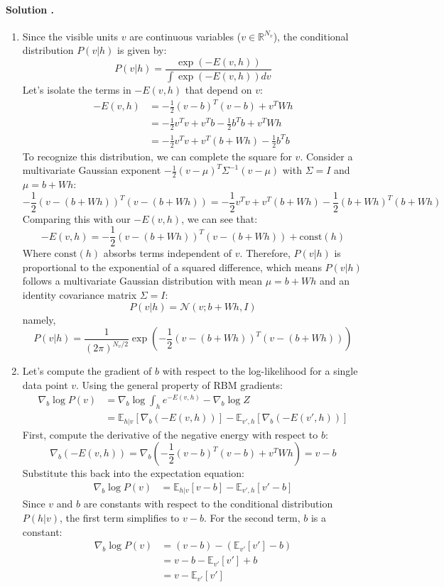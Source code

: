 \documentclass{article}
\newcounter{solutionCount}
\newcommand{\solution}[1]{
    \stepcounter{solutionCount}
    \paragraph{Solution \thesolutionCount.}
    {
        #1
    }
}
\begin{document}
\solution{
    \begin{enumerate}
        \item Since the visible units $v$ are continuous variables ($v \in \mathbb{R}^{N_v}$), the conditional distribution $P(v|h)$ is given by:
        \[ P(v|h) = \frac{\exp(-E(v,h))}{\int \exp(-E(v,h)) dv} \]
        Let's isolate the terms in $-E(v,h)$ that depend on $v$:
        \begin{align*}
        -E(v,h) &= -\frac{1}{2}(v-b)^T(v-b) + v^T Wh \\
        &= -\frac{1}{2}v^T v + v^T b - \frac{1}{2}b^T b + v^T Wh \\
        &= -\frac{1}{2}v^T v + v^T(b + Wh) - \frac{1}{2}b^T b
        \end{align*}
        To recognize this distribution, we can complete the square for $v$. Consider a multivariate Gaussian exponent $-\frac{1}{2}(v-\mu)^T \Sigma^{-1} (v-\mu)$ with $\Sigma = I$ and $\mu = b + Wh$:
        \[ -\frac{1}{2}(v - (b+Wh))^T (v - (b+Wh)) = -\frac{1}{2}v^T v + v^T(b+Wh) - \frac{1}{2}(b+Wh)^T(b+Wh) \]
        Comparing this with our $-E(v,h)$, we can see that:
        \[ -E(v,h) = -\frac{1}{2}(v - (b+Wh))^T (v - (b+Wh)) + \text{const}(h) \]
        Where $\text{const}(h)$ absorbs terms independent of $v$. Therefore, $P(v|h)$ is proportional to the exponential of a squared difference, which means $P(v|h)$ follows a multivariate Gaussian distribution with mean $\mu = b + Wh$ and an identity covariance matrix $\Sigma = I$:
        \[ P(v|h) = \mathcal{N}(v; b + Wh, I) \]
        namely, 
        $$P(v|h) = \frac{1}{(2\pi)^{N_v/2}} \exp\left(-\frac{1}{2}(v - (b+Wh))^T (v - (b+Wh))\right)$$

        \item Let's compute the gradient of $b$ with respect to the log-likelihood for a single data point $v$. Using the general property of RBM gradients:
        \begin{align*}
        \nabla_b \log P(v) &= \nabla_b \log \int_{h} e^{-E(v,h)} - \nabla_b \log Z \\
        &= \mathbb{E}_{h|v}[\nabla_b (-E(v,h))] - \mathbb{E}_{v',h}[\nabla_b (-E(v',h))]
        \end{align*}
        First, compute the derivative of the negative energy with respect to $b$:
        \[ \nabla_b (-E(v,h)) = \nabla_b \left( -\frac{1}{2}(v-b)^T(v-b) + v^T Wh \right) = v - b \]
        Substitute this back into the expectation equation:
        \begin{align*}
        \nabla_b \log P(v) &= \mathbb{E}_{h|v}[v - b] - \mathbb{E}_{v',h}[v' - b]
        \end{align*}
        Since $v$ and $b$ are constants with respect to the conditional distribution $P(h|v)$, the first term simplifies to $v - b$. For the second term, $b$ is a constant:
        \begin{align*}
        \nabla_b \log P(v) &= (v - b) - (\mathbb{E}_{v'}[v'] - b) \\
        &= v - b - \mathbb{E}_{v'}[v'] + b \\
        &= v - \mathbb{E}_{v'}[v']
        \end{align*}
    \end{enumerate}
}
\end{document}
